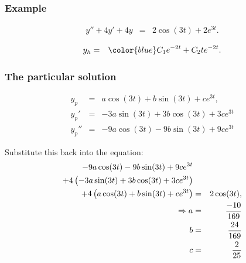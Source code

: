 \begin{frame}
  \frametitle{Example}

  \begin{eqnarray*}
    y'' + 4y' + 4y & = & 2 \cos(3t) + 2e^{3t}.
  \end{eqnarray*}

  {
    \begin{eqnarray*}
      y_h & = & {\color{blue}C_1 e^{-2t} + C_2 t e^{-2t}}.
    \end{eqnarray*}
  }

\end{frame}


\begin{frame}
  \frametitle{The particular solution}

  \begin{eqnarray*}
    y_p & = & a \cos(3t) + b \sin(3t) + ce^{3t}, \\
    y_p' & = & -3 a \sin(3t) + 3b \cos(3t) + 3 c e^{3t}\\
    y_p'' & = & -9 a \cos(3t) - 9b \sin(3t) + 9 c e^{3t}
  \end{eqnarray*}

  Substitute this back into the equation:
  \begin{eqnarray*}
    -9 a \cos(3t) - 9b \sin(3t) + 9 c e^{3t} & & \\
    + 4 \left( -3 a \sin(3t) + 3b \cos(3t) + 3c e^{3t}\right)  & & \\
    + 4 \left( a \cos(3t) + b \sin(3t) + c e^{3t}\right)
     & = & 2 \cos(3t), \\
    \Rightarrow 
    a & = & \frac{-10}{169} \\
    b & = & \frac{24}{169} \\
    c & = & \frac{2}{25} 
  \end{eqnarray*}


\end{frame}



